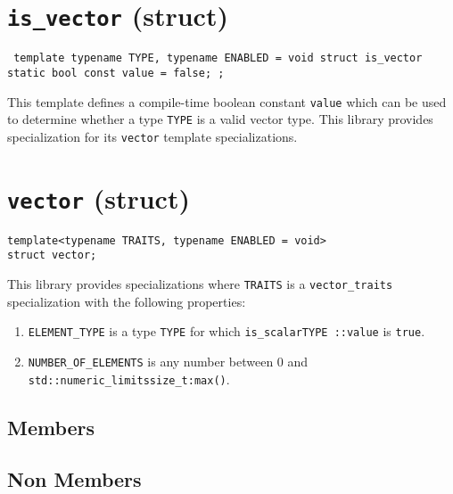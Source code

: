 \documentclass[oneside]{book}
\begin{document}
\section{\texttt{is\_vector} (struct)}
\texttt{
template \textlangle typename TYPE, typename ENABLED = void\textrangle\newline
struct is\_vector {\newline
  static bool const value = false;\newline
};}

\noindent{}This template defines a compile-time boolean constant \texttt{value}
which can be used to determine whether a type \texttt{TYPE} is a valid vector type.
This library provides specialization for its \texttt{vector} template specializations.

\section{\texttt{vector} (struct)}
\begin{verbatim}
template<typename TRAITS, typename ENABLED = void>
struct vector;
\end{verbatim}
\noindent{}This library provides specializations where \texttt{TRAITS} is a \texttt{vector\_traits}
specialization with the following properties:
\begin{enumerate}
	\item \texttt{ELEMENT\_TYPE} is a type \texttt{TYPE} for which \texttt{is\_scalar\textlangle TYPE \textrangle::value} is \texttt{true}.
	\item \texttt{NUMBER\_OF\_ELEMENTS} is any number between 0 and \texttt{std::numeric\_limits\textlangle size\_t\textrangle\::max()}.
\end{enumerate}



\subsection{Members}

\subsection{Non Members}
\end{document}
